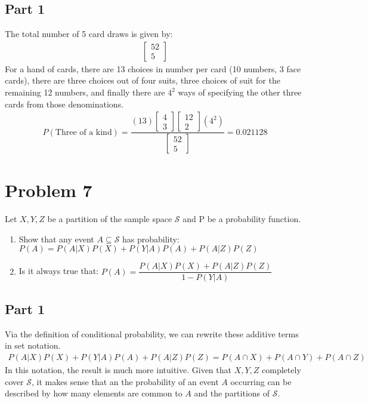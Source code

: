 \documentclass{article}
\begin{document}
\subsection*{Part 1}
The total number of 5 card draws is given by:
\begin{align*}
\begin{bmatrix}
52 \\
5
\end{bmatrix}
\end{align*}
For a hand of cards, there are 13 choices in number per card (10 numbers, 3 face cards), there are three choices out of four suits, three choices of suit for the remaining 12 numbers, and finally there are $4^2$ ways of specifying the other three cards from those denominations.
\begin{align*}
\boxed{P(\text{Three of a kind}) = 
\dfrac{(13)
\begin{bmatrix}
4 \\
3
\end{bmatrix}
\begin{bmatrix}
12 \\
2
\end{bmatrix}
(4^2)}
{\begin{bmatrix}
52 \\
5
\end{bmatrix}} = 0.021128}
\end{align*}


\clearpage
\section*{Problem 7}
Let $X,Y,Z$ be a partition of the sample space $\mathcal{S}$ and P be a probability function.
    \begin{enumerate}
    \item
    Show that any event $A\subseteq \mathcal{S}$ has probability: $P(A) = P(A|X)P(X)+P(Y|A)P(A)+P(A|Z)P(Z)$
    \item
    Is it always true that: $P(A) = \dfrac{P(A|X)P(X)+P(A|Z)P(Z)}{1-P(Y|A)}$
    \end{enumerate}
\subsection*{Part 1}

Via the definition of conditional probability, we can rewrite these additive terms in set notation.
\begin{align*}
P(A|X)P(X)+P(Y|A)P(A)+P(A|Z)P(Z) = P(A\cap X) + P(A\cap Y) + P(A\cap Z)
\end{align*}
In this notation, the result is much more intuitive. Given that $X,Y,Z$ completely cover $\mathcal{S}$, it makes sense that an the probability of an event $A$ occurring can be described by how many elements are common to $A$ and the partitions of $\mathcal{S}$.
\end{document}
